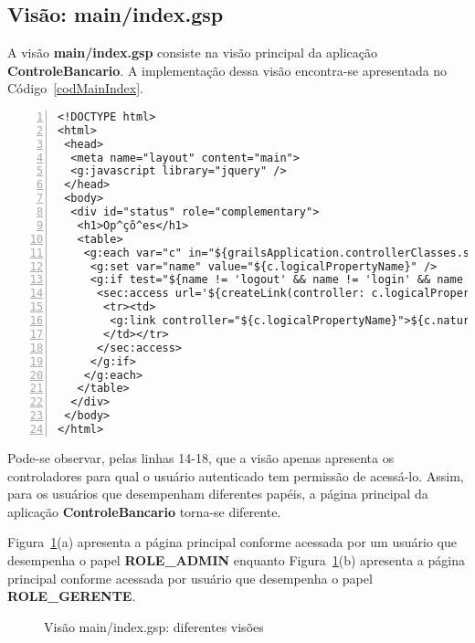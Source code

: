 \subsection{Visão: main/index.gsp}

\vspace{0.5cm}

A  visão {\bf  main/index.gsp} consiste  na  visão principal  da aplicação  {\bf
  ControleBancario}.   A implementação  dessa visão  encontra-se  apresentada no
Código~\ref{codMainIndex}.  

\lstset{language=XML}
\begin{lstlisting}[numbers=left, caption=Visão {\bf main/index.gsp}, frame=trBL,
    float=htbp, label=codMainIndex] 
<!DOCTYPE html>
<html>
 <head>
  <meta name="layout" content="main">
  <g:javascript library="jquery" />
 </head>
 <body>
  <div id="status" role="complementary">
   <h1>Op^çõ^es</h1>
   <table>
    <g:each var="c" in="${grailsApplication.controllerClasses.sort { it.fullName } }">
     <g:set var="name" value="${c.logicalPropertyName}" />
     <g:if test="${name != 'logout' && name != 'login' && name != 'main'}">
      <sec:access url='${createLink(controller: c.logicalPropertyName, base: "/")}'>
       <tr><td>    
        <g:link controller="${c.logicalPropertyName}">${c.naturalName.replace(" Controller","")}</g:link>
       </td></tr>
      </sec:access>
     </g:if>
    </g:each>
   </table>
  </div>
 </body>
</html>
\end{lstlisting}

Pode-se  observar,  pelas  linhas  14-18,   que  a  visão  apenas  apresenta  os
controladores para qual o usuário autenticado tem permissão de acessá-lo. Assim,
para  os usuários  que  desempenham  diferentes papéis,  a  página principal  da
aplicação {\bf ControleBancario} torna-se diferente. 

\vspace{0.2cm}

Figura~\ref{figVisao}(a) apresenta  a página principal conforme  acessada por um
usuário    que     desempenha    o    papel     {\bf    ROLE\_ADMIN}    enquanto
Figura~\ref{figVisao}(b)  apresenta  a página  principal  conforme acessada  por
usuário que desempenha o papel {\bf ROLE\_GERENTE}.  

\newpage

\begin{figure}[htbp]
\center
{}
\qquad
{}
\caption{Visão main/index.gsp: diferentes visões}
\label{figVisao}
\end{figure}

